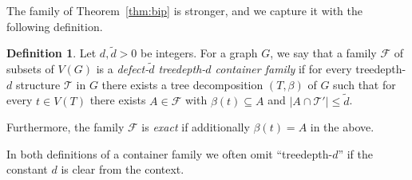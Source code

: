 \documentclass[11pt,a4paper]{article}
\theoremstyle{definition}
\newtheorem{definition}[theorem]{Definition}
\def\T{\mathcal{T}}
\begin{document}
The family of Theorem~\ref{thm:bip} is stronger, and we capture it with 
the following definition.
\begin{definition}
Let $d,\widetilde{d} > 0$ be integers.
For a graph $G$, we say
that a family $\mathcal{F}$ of subsets of $V(G)$
is a \emph{defect-$\widetilde{d}$ treedepth-$d$
  container family} 
if for every treedepth-$d$ structure $\T$ in $G$
there exists a tree decomposition $(T,\beta)$ of $G$
such that for every $t \in V(T)$ there exists $A \in \mathcal{F}$
with $\beta(t) \subseteq A$ and $|A \cap \T'| \leq \widetilde{d}$. 

Furthermore, the family $\mathcal{F}$ is \emph{exact} if
additionally $\beta(t) = A$ in the above. 
\end{definition}

In both definitions of a container family we often omit ``treedepth-$d$''
if the constant $d$ is clear from the context.
\end{document}
